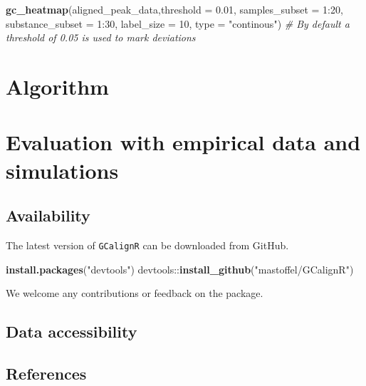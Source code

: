 \documentclass[]{article}
\newenvironment{Shaded}{}{}
\newcommand{\KeywordTok}[1]{\textbf{{#1}}}
\newcommand{\DataTypeTok}[1]{\textcolor[rgb]{0.50,0.00,0.00}{{#1}}}
\newcommand{\DecValTok}[1]{\textcolor[rgb]{0.00,0.00,1.00}{{#1}}}
\newcommand{\FloatTok}[1]{\textcolor[rgb]{0.50,0.00,0.50}{{#1}}}
\newcommand{\StringTok}[1]{\textcolor[rgb]{0.87,0.00,0.00}{{#1}}}
\newcommand{\CommentTok}[1]{\textcolor[rgb]{0.50,0.50,0.50}{\textit{{#1}}}}
\newcommand{\NormalTok}[1]{{#1}}
\begin{document}
\begin{Shaded}
\begin{Highlighting}[]
\KeywordTok{gc_heatmap}\NormalTok{(aligned_peak_data,}\DataTypeTok{threshold =} \FloatTok{0.01}\NormalTok{, }\DataTypeTok{samples_subset =} \DecValTok{1}\NormalTok{:}\DecValTok{20}\NormalTok{, }\DataTypeTok{substance_subset =} \DecValTok{1}\NormalTok{:}\DecValTok{30}\NormalTok{, }\DataTypeTok{label_size =} \DecValTok{10}\NormalTok{, }\DataTypeTok{type =} \StringTok{"continous"}\NormalTok{) }\CommentTok{# By default a threshold of 0.05 is used to mark deviations}
\end{Highlighting}
\end{Shaded}

\section{Algorithm}\label{algorithm}

\section{Evaluation with empirical data and
simulations}\label{evaluation-with-empirical-data-and-simulations}

\subsection{Availability}\label{availability}

The latest version of \texttt{GCalignR} can be downloaded from GitHub.

\begin{Shaded}
\begin{Highlighting}[]
\KeywordTok{install.packages}\NormalTok{(}\StringTok{"devtools"}\NormalTok{)}
\NormalTok{devtools::}\KeywordTok{install_github}\NormalTok{(}\StringTok{"mastoffel/GCalignR"}\NormalTok{)}
\end{Highlighting}
\end{Shaded}

We welcome any contributions or feedback on the package.

\subsection{Data accessibility}\label{data-accessibility}

\subsection*{References}\label{references}
\end{document}
